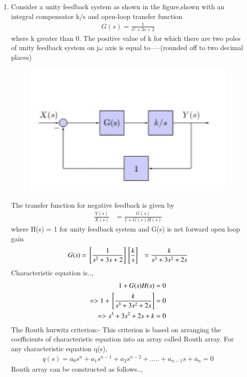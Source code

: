 \begin{enumerate}[label=\thesection.\arabic*.,ref=\thesection.\theenumi]

\item
Consider a unity feedback system as shown in the figure,shown with an integral compensator k/s and open-loop transfer function
\begin{align}
G(s) = \frac{1}{s^2+3s+2}
\end{align}
where k greater than 0. The positive value of k for which there are two poles of unity feedback system on j${\omega}$ axis is equal to-----(rounded off to two decimal places)
\begin{figure}
\centering
\includegraphics[width=\columnwidth]{./figs/ee18btech11005_fig.eps}
\end{figure}
\solution The transfer function for negative feedback is given by
\begin{align}
\frac{Y(s)}{X(s)} &= \frac{G(s)}{1+G(s)H(s)}
\end{align}
where H(s) = 1 for unity feedback system
and G(s) is net forward open loop gain
\begin{align}
G(s) &=  {}\left[\frac{1}{s^2+3s+2}\right]{}\left[\frac{k}{s}\right]
&= \frac{k}{s^3+3s^2+2s}
\end{align}
Characteristic equation is..,
\begin{align}
 1 + G(s)H(s) = 0 \label{eq:sec_order_op}
\\
=> 1 + {}\left[\frac{k}{s^3+3s^2+2s}\right] = 0
\\
=> s^3+3s^2+2s+k = 0
\end{align}
The Routh hurwitz criterion:-
This criterion is based on arranging the coefficients of characteristic equation into an array called Routh array.
For any characteristic equation q(s),
\begin{align}
q(s) = a_0s^n+a_1s^{n-1}+a_2s^{n-2}+.....+a_{n-1}s+a_n = 0
\end{align}
Routh array can be constructed as follows..,
 

\end{enumerate}
